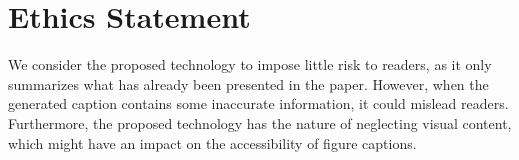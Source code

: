 \documentclass[11pt]{article}
\begin{document}
\section*{Ethics Statement}
We consider the proposed technology to impose little risk to readers, as it only summarizes what has already been presented in the paper.
However, when the generated caption contains some inaccurate information, it could mislead readers.
Furthermore, the proposed technology has the nature of neglecting visual content, which might have an impact on the accessibility of figure captions.





\clearpage

\appendix

\end{document}
